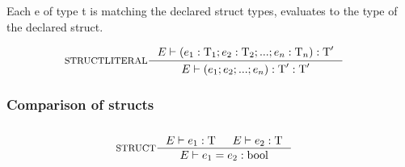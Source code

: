 Each e of type t is matching the declared struct types, evaluates to the type of the declared struct.

\begin{align*}
&\inference[STRUCTLITERAL]{\Tenv (e_1 : \Tt_1;e_2 : \Tt_2;...;e_n : \Tt_n):\Tt'}
                 {\Tenv \mathbin{\text{(}} e_1; e_2;...;e_n\mathbin{\text{)}}:\Tt': \Tt'}
\end{align*}

\subsubsection{Comparison of structs}
\begin{align*}
\intertext{}
&\inference[STRUCT]{\Tenv e_1: \Tt & \Tenv e_2: \Tt}
                 {\Tenv e_1 = e_2: \Tbool}
\end{align*}
